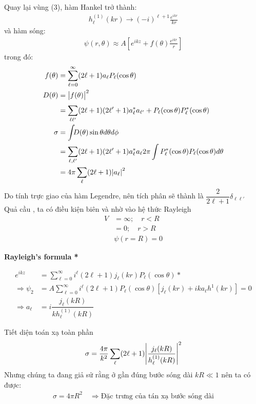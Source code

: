 \documentclass{report}
\renewcommand{\l}{\ell}
\begin{document}
Quay lại vùng (3), hàm Hankel trở thành:
\begin{align*}
	h_{\l}^{(1)}(kr) \rightarrow (-i)^{\l+1}\frac{e^{ikr}}{kr}
\end{align*}
và hàm sóng:
\begin{align*}
	\psi(r,\theta) \approx A \left[e^{ikz}+ f(\theta)\frac{e^{ikr}}{r}\right]
\end{align*}
trong đó:
\begin{align*}
	f(\theta) & = \sum_{\l=0}^{\infty}(2\l+1)a_{\l} P_{\l}(\cos\theta)                                                               \\
	D(\theta) & = \abs{f(\theta)}^2                                                                                                  \\
	          & = \sum_{\l\l'}^{}(2\l+1)(2\l'+1) a^{\ast}_{\l} a_{\l'} + P_{\l}(\cos\theta) P^{*}_{\l}(\cos\theta)                   \\
	\sigma    & =    \int_{}D(\theta)\sin\theta d\theta d\phi                                                                        \\
	          & = \sum_{\l,\l'}^{}(2\l+1)(2\l'+1)a^{\ast}_{\l}a_{\l} 2\pi\int P_{\l}^{\ast}(\cos\theta)   P_{\l}(\cos\theta) d\theta \\
	          & = 4\pi \sum_{\l}(2\l+1)\abs{a_\l}^2
\end{align*}
Do tính trực giao của hàm Legendre, nên tích phân sẽ thành là $\dfrac{2}{2\l+1}\delta_{\l\l'}$\\
Quả cầu , ta có điều kiện biên và nhờ vào hệ thức Rayleigh
\begin{align*}
	V & = \infty; \quad r<R \\
	  & = 0; \quad r>R      \\
	  & \psi(r=R) = 0
\end{align*}

\textbf{Rayleigh’s formula *}

\begin{align}
	e^{ikz}            & = \sum_{\l=0}^{\infty}i^{\l}(2\l+1)j_{\l} (kr) P_{\l}(\cos\theta) *                                                  \\
	\Rightarrow \psi_2 & = A\sum_{\l=0}^{\infty}i^{\l}(2\l+1)P_{\l}(\cos\theta)\left[ j_{\l} (kr)+ika_{\l}h^{1}(kr) \right] = 0 \label{eq1.5} \\
	\Rightarrow a_{\l} & = i\dfrac{j_{\l}(kR)}{k h^{(1)}_{\l}(kR)}\nonumber
\end{align}

Tiết diện toán xạ toàn phần
\begin{align*}
	\sigma = \dfrac{4\pi}{k^2}\sum_{\l}(2\l+1) \abs{\dfrac{j_{\l}(kR)}{h^{(1)}_{\l}(kR)}}^2
\end{align*}
Nhưng chúng ta đang giả sử rằng ở gần đúng bước sóng dài $kR\ll 1$ nên ta có được:
\begin{align*}
	\sigma = 4\pi R^2 \quad \Rightarrow\text{Đặc trưng của tán xạ bước sóng dài}
\end{align*}
\end{document}
